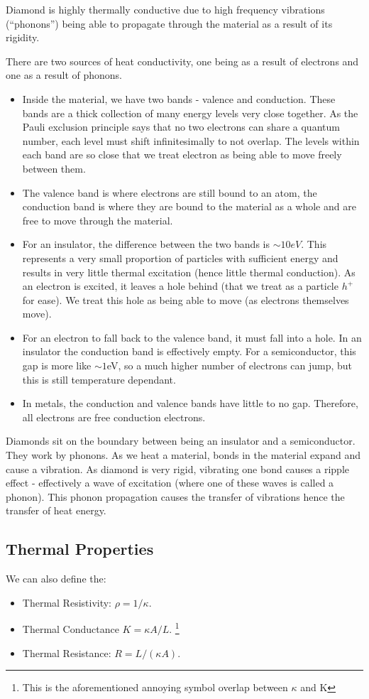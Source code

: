 Diamond is highly thermally conductive due to high frequency vibrations (``phonons'') being able to propagate through the material as a result of its rigidity.

There are two sources of heat conductivity, one being as a result of electrons and one as a result of phonons.
\begin{itemize}
    \item Inside the material, we have two bands - valence and conduction. These bands are a thick collection of many energy levels very close together. As the Pauli exclusion principle says that no two electrons can share a quantum number, each level must shift infinitesimally to not overlap. The levels within each band are so close that we treat electron as being able to move freely between them.
    \item The valence band is where electrons are still bound to an atom, the conduction band is where they are bound to the material as a whole and are free to move through the material.
    \item For an insulator, the difference between the two bands is $\sim 10 \si{eV}$. This represents a very small proportion of particles with sufficient energy and results in very little thermal excitation (hence little thermal conduction). As an electron is excited, it leaves a hole behind (that we treat as a particle $h^+$ for ease). We treat this hole as being able to move (as electrons themselves move).
    \item For an electron to fall back to the valence band, it must fall into a hole. In an insulator the conduction band is effectively empty. For a semiconductor, this gap is more like $\sim 1$eV, so a much higher number of electrons can jump, but this is still temperature dependant.
    \item In metals, the conduction and valence bands have little to no gap. Therefore, all electrons are free conduction electrons.
\end{itemize}

Diamonds sit on the boundary between being an insulator and a semiconductor. They work by phonons. As we heat a material, bonds in the material expand and cause a vibration. As diamond is very rigid, vibrating one bond causes a ripple effect - effectively a wave of excitation (where one of these waves is called a phonon). This phonon propagation causes the transfer of vibrations hence the transfer of heat energy.

\subsection{Thermal Properties}
We can also define the:
\begin{itemize}
    \item Thermal Resistivity: $\rho = 1/\kappa$.
    \item Thermal Conductance $K = \kappa A / L$. \footnote{This is the aforementioned annoying symbol overlap between $\kappa$ and K}
    \item Thermal Resistance: $R = L / (\kappa A)$.
\end{itemize}

